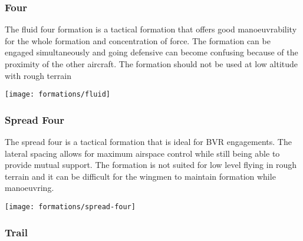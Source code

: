 \subsubsection{Four}

The fluid four formation is a tactical formation that offers good
manoeuvrability for the whole formation and concentration of force. The
formation can be engaged simultaneously and going defensive can become
confusing because of the proximity of the other aircraft. The formation should
not be used at low altitude with rough terrain

\begin{center}
  \texttt{[image: formations/fluid]}%
\end{center}


\subsubsection{Spread Four}

The spread four is a tactical formation that is ideal for BVR engagements. The
lateral spacing allows for maximum airspace control while still being able to
provide mutual support. The formation is not suited for low level flying in
rough terrain and it can be difficult for the wingmen to maintain formation
while manoeuvring.

\begin{center}
  \texttt{[image: formations/spread-four]}%
\end{center}


\subsubsection{Trail}


